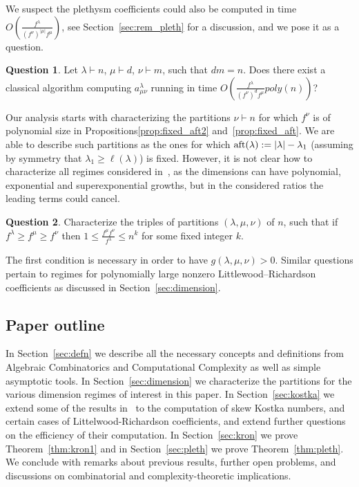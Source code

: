 \documentclass[11pt]{amsart}
\theoremstyle{plain}
\theoremstyle{definition}
\newtheorem{ques}{Question}
\numberwithin{equation}{section}
\newcommand{\la}{\lambda}
\newcommand{\poly}{poly}
\def\la{\lambda}
\begin{document}
We suspect the plethysm coefficients could also be computed  in time $O\left( \frac{f^\la}{(f^\nu)^{|\mu|} f^\mu} \right)$, see Section~\ref{sec:rem_pleth} for a discussion, and we pose it as a question. 

\begin{ques}\label{q:pleth}
Let $\la \vdash n$, $\mu \vdash d$, $ \nu \vdash m$, such that $dm=n$. Does there exist a classical algorithm computing $a^\la_{\mu \nu}$  running in time $O\left( \frac{f^\la}{(f^{\nu})^d f^\mu}  \poly(n) \right)$?
\end{ques}

Our analysis starts with characterizing the partitions $\nu\vdash n$ for which $f^\nu$ is of polynomial size in Propositions\ref{prop:fixed_aft2} and~\ref{prop:fixed_aft}. We are able to describe such partitions as the ones for which ${\rm aft}(\la):=|\la|-\la_1$ (assuming by symmetry that $\la_1\geq \ell(\la)$) is fixed. However, it is not clear how to characterize all regimes considered in~\cite{LH24}, as the dimensions can have polynomial, exponential and superexponential growths, but in the considered ratios the leading terms could cancel.

\begin{ques}\label{q:triples}
Characterize the triples of partitions $(\la,\mu,\nu)$ of $n$, such that if $f^\la \geq f^\mu \geq f^\nu$ then $1\leq \frac{f^\mu f^\nu}{f^\la} \leq n^k$ for some fixed integer $k$.  
\end{ques}
The first condition is necessary in order to have $g(\la,\mu,\nu)>0$. Similar questions pertain to regimes for polynomially large nonzero Littlewood--Richardson coefficients as discussed in Section~\ref{sec:dimension}. 

\subsection*{Paper outline} 
In Section~\ref{sec:defn} we describe all the necessary concepts and definitions from Algebraic Combinatorics and Computational Complexity as well as simple asymptotic tools. In Section~\ref{sec:dimension} we characterize the partitions for the various dimension regimes of interest in this paper. In Section~\ref{sec:kostka} 
we extend some of the results in~\cite{LH24} to the computation of skew Kostka numbers, and certain cases of Littelwood-Richardson coefficients, and extend further questions on the efficiency of their computation. In Section~\ref{sec:kron} we prove Theorem~\ref{thm:kron1} and in Section~\ref{sec:pleth} we prove Theorem~\ref{thm:pleth}. We conclude with remarks about previous results, further open problems, and discussions on combinatorial and complexity-theoretic implications.  
\end{document}
